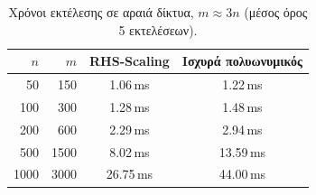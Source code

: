 \begin{table}[h]
\centering
\caption{Χρόνοι εκτέλεσης σε αραιά δίκτυα, $m \approx 3n$ (μέσος όρος 5 εκτελέσεων).}
\label{tab:sparse}
\begin{tabular}{rrcc}
\toprule
$n$ & $m$ & \textenglish{RHS-Scaling} & Ισχυρά πολυωνυμικός \\
\midrule
  50 & 150 & 1.06\,ms & 1.22\,ms \\
  100 & 300 & 1.28\,ms & 1.48\,ms \\
  200 & 600 & 2.29\,ms & 2.94\,ms \\
  500 & 1500 & 8.02\,ms & 13.59\,ms \\
  1000 & 3000 & 26.75\,ms & 44.00\,ms \\
\bottomrule
\end{tabular}
\end{table}
